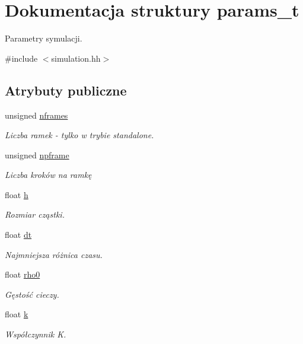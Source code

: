 \hypertarget{structparams__t}{}\section{Dokumentacja struktury params\+\_\+t}
\label{structparams__t}


Parametry symulacji.  




{\ttfamily \#include $<$simulation.\+hh$>$}

\subsection*{Atrybuty publiczne}
\begin{DoxyCompactItemize}
\item 
unsigned \hyperlink{structparams__t_a2cecc28f4ca024657cf567047e2aba59}{nframes}
\begin{DoxyCompactList}\small\item\em Liczba ramek -\/ tylko w trybie standalone. \end{DoxyCompactList}\item 
unsigned \hyperlink{structparams__t_a06a1a567fd5ba13905514227e2bb710a}{npframe}
\begin{DoxyCompactList}\small\item\em Liczba kroków na ramkę \end{DoxyCompactList}\item 
float \hyperlink{structparams__t_a27d76064f2ae0cb93a0956027cfcc19b}{h}
\begin{DoxyCompactList}\small\item\em Rozmiar cząstki. \end{DoxyCompactList}\item 
float \hyperlink{structparams__t_a81fc6596e9b1446442ebf3eef2c3fb01}{dt}
\begin{DoxyCompactList}\small\item\em Najmniejsza różnica czasu. \end{DoxyCompactList}\item 
float \hyperlink{structparams__t_a2eb309edb681d0a998f23fc692a73781}{rho0}
\begin{DoxyCompactList}\small\item\em Gęstość cieczy. \end{DoxyCompactList}\item 
float \hyperlink{structparams__t_a97ee2783cf89cee1151be3250e9054b3}{k}
\begin{DoxyCompactList}\small\item\em Współczynnik K. \end{DoxyCompactList}\item 

\end{DoxyCompactItemize}
